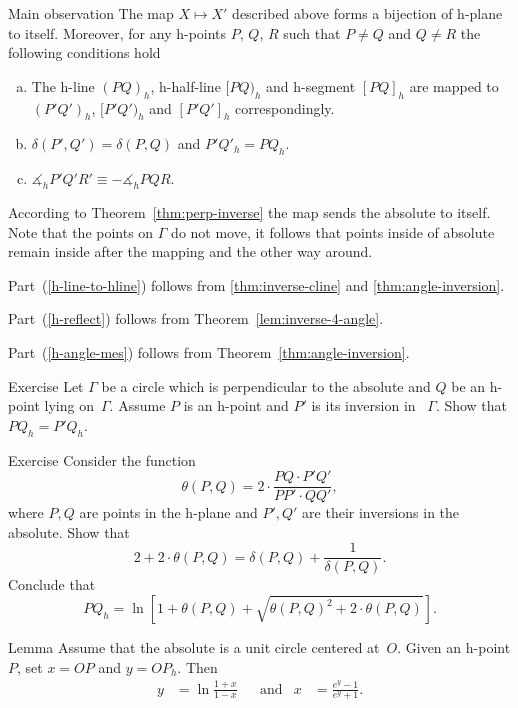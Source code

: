 \begin{thm}{Main observation}\label{thm:main-observ}
The map $X\mapsto X'$ described above forms a bijection of h-plane to itself. 
Moreover, for any h-points $P$, $Q$, $R$ such that $P\ne Q$ and $Q\ne R$ the following conditions hold
\begin{enumerate}[(a)]
\item\label{h-line-to-hline} The h-line $(PQ)_h$, h-half-line $[PQ)_h$ and h-segment $[PQ]_h$ are mapped to  $(P'Q')_h$, $[P'Q')_h$ and $[P'Q']_h$ correspondingly.
\item\label{h-reflect} $\delta(P',Q')=\delta(P,Q)$ and $P'Q'_h=PQ_h$.
\item\label{h-angle-mes} 
$\measuredangle_h P'Q'R'\equiv-\measuredangle_h PQR$.
\end{enumerate}

\end{thm}

According to Theorem~\ref{thm:perp-inverse} the map sends the absolute to itself. 
Note that the points on $\Gamma$ do not move, it follows that points inside of absolute remain inside after the mapping and the other way around. 


Part~(\ref{h-line-to-hline}) follows from \ref{thm:inverse-cline} and \ref{thm:angle-inversion}.

Part~(\ref{h-reflect}) follows from Theorem~\ref{lem:inverse-4-angle}.

Part~(\ref{h-angle-mes})  follows from Theorem~\ref{thm:angle-inversion}.
\qeds


\begin{thm}{Exercise}\label{ex:h-reflection}
Let $\Gamma$ be a circle which is perpendicular to the absolute and $Q$ be an h-point lying on~$\Gamma$.
Assume $P$ is an h-point and $P'$ is its inversion in ~$\Gamma$.
Show that $PQ_h=P'Q_h$.
\end{thm}

\begin{thm}{Exercise}\label{ex:def-delta}
Consider the function
\[\theta(P,Q)=2\cdot\frac{PQ\cdot  P'Q'}{PP'\cdot QQ'},\]
where $P, Q$ are points in the h-plane
and $P', Q'$ are their inversions in the absolute.
Show that 
\[2+2\cdot\theta(P,Q)
=
\delta(P,Q)+\frac{1}{\delta(P,Q)}.\]
Conclude that
\[PQ_h=\ln\left[1+\theta(P,Q)+\sqrt{\theta(P,Q)^2+2\cdot\theta(P,Q)}\right].\]

\end{thm}


\begin{thm}{Lemma}\label{lem:O-h-dist}
Assume that the absolute is a unit circle centered at~$O$.
Given an h-point $P$, set $x=OP$ and $y=OP_h$.
Then
\begin{align*}
y&=\ln\frac{1+x}{1-x}
&
&\text{and}
&
x&=\frac{e^y-1}{e^y+1}.
\end{align*}
 
\end{thm}

